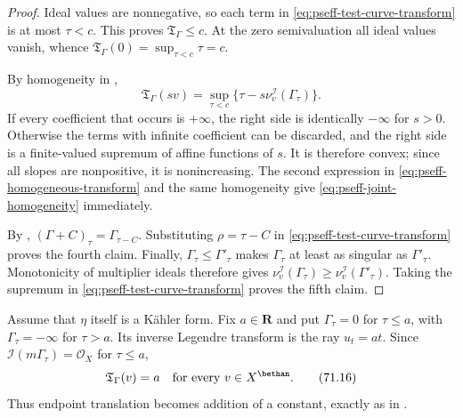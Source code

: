 \begin{proof}
Ideal values are nonnegative, so each term in
\eqref{eq:pseff-test-curve-transform} is at most \(\tau<c\).  This proves
\(\mathfrak T_\Gamma\leq c\).  At the zero semivaluation all ideal values
vanish, whence
\(\mathfrak T_\Gamma(0)=\sup_{\tau<c}\tau=c\).

By homogeneity in ,
\[
 \mathfrak T_\Gamma(sv)
 =\sup_{\tau<c}
      \{\tau-s\nu_v^{\mathcal I}(\Gamma_\tau)\}.
\tag{71.15}\label{eq:pseff-raywise-affine-supremum}
\]
If every coefficient that occurs is \(+\infty\), the right side is
identically \(-\infty\) for \(s>0\).  Otherwise the terms with infinite
coefficient can be discarded, and the right side is a finite-valued
supremum of affine functions of \(s\).  It is therefore convex; since all
slopes are
nonpositive, it is nonincreasing.  The second expression
in \eqref{eq:pseff-homogeneous-transform} and the same homogeneity give
\eqref{eq:pseff-joint-homogeneity} immediately.

By \cite[Definition~4.3]{Xia23Operations},
\((\Gamma+C)_\tau=\Gamma_{\tau-C}\).  Substituting
\(\rho=\tau-C\) in \eqref{eq:pseff-test-curve-transform} proves the fourth
claim.  Finally, \(\Gamma_\tau\leq\Gamma'_\tau\) makes
\(\Gamma_\tau\) at least as singular as \(\Gamma'_\tau\).  Monotonicity of multiplier ideals therefore gives
\(\nu_v^{\mathcal I}(\Gamma_\tau)\geq
\nu_v^{\mathcal I}(\Gamma'_\tau)\).  Taking the supremum in
\eqref{eq:pseff-test-curve-transform} proves the fifth claim.
\end{proof}

\begin{example}
Assume that \(\eta\) itself is a K\"ahler form.  Fix \(a\in\mathbf R\) and
put \(\Gamma_\tau=0\) for \(\tau\leq a\), with
\(\Gamma_\tau=-\infty\) for \(\tau>a\).  Its inverse Legendre transform is
the ray \(u_t=at\).  Since
\(\mathcal I(m\Gamma_\tau)=\mathcal O_X\) for \(\tau\leq a\),
\[
                         \mathfrak T_\Gamma(v)=a
                         \quad\text{for every }v\in X^{\bethan}.
\tag{71.16}\label{eq:pseff-constant-transform}
\]
Thus endpoint translation becomes addition of a constant, exactly as in
.
\end{example}

